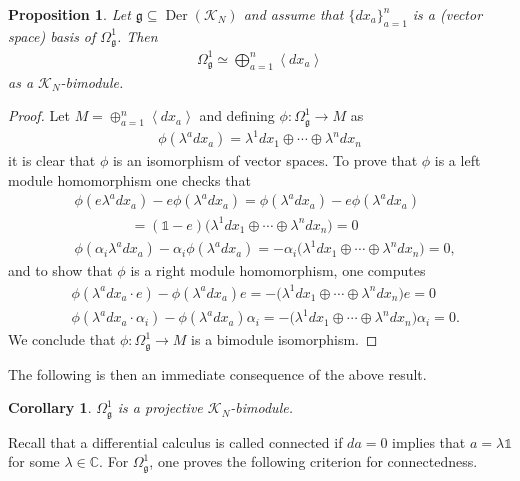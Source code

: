 \documentclass{amsart}
\newcommand{\complex}{\mathbb{C}}
\newcommand{\angles}[1]{\left\langle #1 \right\rangle}
\newcommand{\paraa}[1]{\big(#1\big)}
\newtheorem{corollary}[theorem]{Corollary}
\newtheorem{proposition}[theorem]{Proposition}
\theoremstyle{definition}
\theoremstyle{remark}
\numberwithin{equation}{section}
\newcommand{\K}{\mathcal{K}}
\renewcommand{\mid}{\mathds{1}}
\newcommand{\KN}{\K_N}
\newcommand{\Der}{\operatorname{Der}}
\newcommand{\g}{\mathfrak{g}}
\newcommand{\Omegaoneg}{\Omega^1_{\g}}
\begin{document}
\begin{proposition}\label{prop:Omegag.direct.sum}
  Let $\g\subseteq\Der(\KN)$ and assume that $\{dx_a\}_{a=1}^n$ is a
  (vector space) basis of $\Omegaoneg$. Then
  \begin{align*}
    \Omegaoneg\simeq \bigoplus_{a=1}^n\angles{dx_a}
  \end{align*}
  as a $\KN$-bimodule.
\end{proposition}

\begin{proof}
  Let $M=\oplus_{a=1}^n\angles{dx_a}$ and defining $\phi:\Omegaoneg\to M$
  as
  \begin{align*}
    \phi(\lambda^adx_a) = \lambda^1dx_1\oplus\cdots\oplus\lambda^ndx_n
  \end{align*}
  it is clear that $\phi$ is an isomorphism of vector spaces. To prove
  that $\phi$ is a left module homomorphism one checks that
  \begin{align*}
    &\phi(e \lambda^adx_a)-e\phi(\lambda^adx_a)
    = \phi(\lambda^adx_a)-e\phi(\lambda^adx_a)\\
      &\qquad\qquad=(\mid-e)\paraa{\lambda^1dx_1\oplus\cdots\oplus\lambda^ndx_n}=0\\
    &\phi(\alpha_i\lambda^adx_a)-\alpha_i\phi(\lambda^adx_a)
      = -\alpha_i\paraa{\lambda^1dx_1\oplus\cdots\oplus\lambda^ndx_n}=0,
  \end{align*}
  and to show that $\phi$ is a right module homomorphism, one computes
  \begin{align*}
    &\phi(\lambda^adx_a\cdot e)-\phi(\lambda^adx_a)e
    =-\paraa{\lambda^1dx_1\oplus\cdots\oplus\lambda^ndx_n}e=0\\
    &\phi(\lambda^adx_a\cdot \alpha_i)-\phi(\lambda^adx_a)\alpha_i
    =-\paraa{\lambda^1dx_1\oplus\cdots\oplus\lambda^ndx_n}\alpha_i=0.
  \end{align*}
  We conclude that $\phi:\Omegaoneg\to M$ is a bimodule isomorphism.  
\end{proof}

\noindent
The following is then an immediate consequence of the above result.

\begin{corollary}
  $\Omegaoneg$ is a projective $\KN$-bimodule.
\end{corollary}

\noindent
Recall that a differential calculus is called connected if $da=0$
implies that $a=\lambda\mid$ for some $\lambda\in\complex$. For $\Omegaoneg$,
one proves the following criterion for connectedness.
\end{document}

